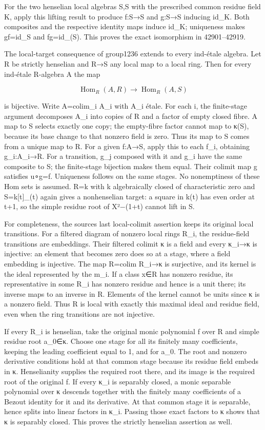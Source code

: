 For the two henselian local algebras S,S\textquotesingle{} with the prescribed common residue field K, apply this lifting result to produce f:S→S\textquotesingle{} and g:S\textquotesingle→S inducing id\_K. Both composites and the respective identity maps induce id\_K; uniqueness makes gf=id\_S and fg=id\_(S\textquotesingle). This proves the exact isomorphism in 42901--42919.

The local-target consequence of group1236 extends to every ind-étale algebra. Let R be strictly henselian and R→S any local map to a local ring. Then for every ind-étale R-algebra A the map

\[
\operatorname{Hom}_R(A,R)\longrightarrow\operatorname{Hom}_R(A,S)
\]

is bijective. Write A=colim\_i A\_i with A\_i étale. For each i, the finite-stage argument decomposes A\_i into copies of R and a factor of empty closed fibre. A map to S selects exactly one copy; the empty-fibre factor cannot map to κ(S), because its base change to that nonzero field is zero. Thus its map to S comes from a unique map to R. For a given f:A→S, apply this to each f\_i, obtaining g\_i:A\_i→R. For a transition, g\_j composed with it and g\_i have the same composite to S; the finite-stage bijection makes them equal. Their colimit map g satisfies u∘g=f. Uniqueness follows on the same stages. No nonemptiness of these Hom sets is assumed. R=k with k algebraically closed of characteristic zero and S=k{[}t{]}\_(t) again gives a nonhenselian target: a square in k(t) has even order at t+1, so the simple residue root of X²−(1+t) cannot lift in S.

For completeness, the source\textquotesingle s last local-colimit assertion keeps its original local transitions. For a filtered diagram of nonzero local rings R\_i, the residue-field transitions are embeddings. Their filtered colimit κ is a field and every κ\_i→κ is injective: an element that becomes zero does so at a stage, where a field embedding is injective. The map R=colim R\_i→κ is surjective, and its kernel is the ideal represented by the m\_i. If a class x∈R has nonzero residue, its representative in some R\_i has nonzero residue and hence is a unit there; its inverse maps to an inverse in R. Elements of the kernel cannot be units since κ is a nonzero field. Thus R is local with exactly this maximal ideal and residue field, even when the ring transitions are not injective.

If every R\_i is henselian, take the original monic polynomial f over R and simple residue root a\_0∈κ. Choose one stage for all its finitely many coefficients, keeping the leading coefficient equal to 1, and for a\_0. The root and nonzero derivative conditions hold at that common stage because its residue field embeds in κ. Henselianity supplies the required root there, and its image is the required root of the original f. If every κ\_i is separably closed, a monic separable polynomial over κ descends together with the finitely many coefficients of a Bezout identity for it and its derivative. At that common stage it is separable, hence splits into linear factors in κ\_i. Passing those exact factors to κ shows that κ is separably closed. This proves the strictly henselian assertion as well.

